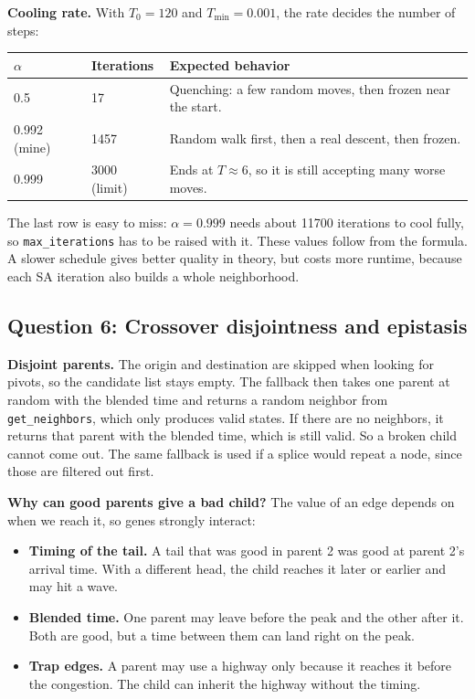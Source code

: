 \documentclass[11pt,a4paper]{article}
\newcommand{\col}[1]{\texttt{#1}}
\begin{document}
\textbf{Cooling rate.} With $T_0 = 120$ and $T_{\min} = 0.001$, the rate decides the number of steps:

\begin{table}[H]
\centering
\begin{tabular}{lll}
\toprule
$\alpha$ & \textbf{Iterations} & \textbf{Expected behavior} \\
\midrule
0.5   & 17 & Quenching: a few random moves, then frozen near the start. \\
0.992 (mine) & 1457 & Random walk first, then a real descent, then frozen. \\
0.999 & 3000 (limit) & Ends at $T \approx 6$, so it is still accepting many worse moves. \\
\bottomrule
\end{tabular}
\end{table}

\noindent The last row is easy to miss: $\alpha = 0.999$ needs about 11700 iterations to cool fully,
so \col{max\_iterations} has to be raised with it. These values follow from the formula. A slower
schedule gives better quality in theory, but costs more runtime, because each SA iteration also builds
a whole neighborhood.

\subsection*{Question 6: Crossover disjointness and epistasis}

\textbf{Disjoint parents.} The origin and destination are skipped when looking for pivots, so the
candidate list stays empty. The fallback then takes one parent at random with the blended time and
returns a random neighbor from \col{get\_neighbors}, which only produces valid states. If there are no
neighbors, it returns that parent with the blended time, which is still valid. So a broken child
cannot come out. The same fallback is used if a splice would repeat a node, since those are filtered
out first.

\textbf{Why can good parents give a bad child?} The value of an edge depends on when we reach it, so
genes strongly interact:
\begin{itemize}
  \item \textbf{Timing of the tail.} A tail that was good in parent 2 was good at parent 2's arrival
  time. With a different head, the child reaches it later or earlier and may hit a wave.
  \item \textbf{Blended time.} One parent may leave before the peak and the other after it. Both are
  good, but a time between them can land right on the peak.
  \item \textbf{Trap edges.} A parent may use a highway only because it reaches it before the
  congestion. The child can inherit the highway without the timing.
\end{itemize}
\end{document}
